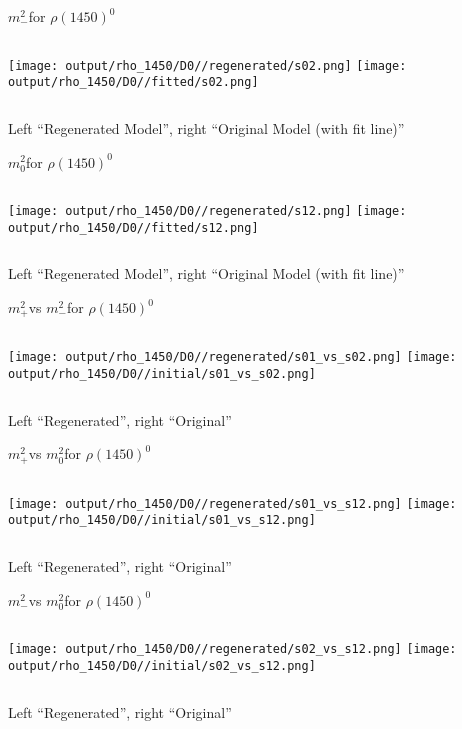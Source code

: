 \documentclass{beamer}
\newcommand{\MP}{\ensuremath{m^2_+}}
\newcommand{\MM}{\ensuremath{m^2_-}}
\newcommand{\MZ}{\ensuremath{m^2_0}}
\begin{document}
\begin{frame}{\MM for $\rho(1450)^0$}
\begin{columns}[t]
\centering
\texttt{[image: output/rho\_1450/D0//regenerated/s02.png]}
\centering
\texttt{[image: output/rho\_1450/D0//fitted/s02.png]}
\end{columns}
    \centering
    Left ``Regenerated Model'', right ``Original Model (with fit line)''
\end{frame}                   

\begin{frame}{\MZ for $\rho(1450)^0$}
\begin{columns}[t]
\centering
\texttt{[image: output/rho\_1450/D0//regenerated/s12.png]}
\centering
\texttt{[image: output/rho\_1450/D0//fitted/s12.png]}
\end{columns}
    \centering
    Left ``Regenerated Model'', right ``Original Model (with fit line)''
\end{frame}                   


\begin{frame}{\MP vs \MM for $\rho(1450)^0$}
\begin{columns}[t]
\centering
\texttt{[image: output/rho\_1450/D0//regenerated/s01\_vs\_s02.png]}
\centering
\texttt{[image: output/rho\_1450/D0//initial/s01\_vs\_s02.png]}
\end{columns}
    \centering
    Left ``Regenerated'', right ``Original''
\end{frame} 


\begin{frame}{\MP vs \MZ for $\rho(1450)^0$}
\begin{columns}[t]
\centering
\texttt{[image: output/rho\_1450/D0//regenerated/s01\_vs\_s12.png]}
\centering
\texttt{[image: output/rho\_1450/D0//initial/s01\_vs\_s12.png]}
\end{columns}
    \centering
    Left ``Regenerated'', right ``Original''
\end{frame} 


\begin{frame}{\MM vs \MZ for $\rho(1450)^0$}
\begin{columns}[t]
\centering
\texttt{[image: output/rho\_1450/D0//regenerated/s02\_vs\_s12.png]}
\centering
\texttt{[image: output/rho\_1450/D0//initial/s02\_vs\_s12.png]}
\end{columns}
    \centering
    Left ``Regenerated'', right ``Original''
\end{frame} 
\end{document}
